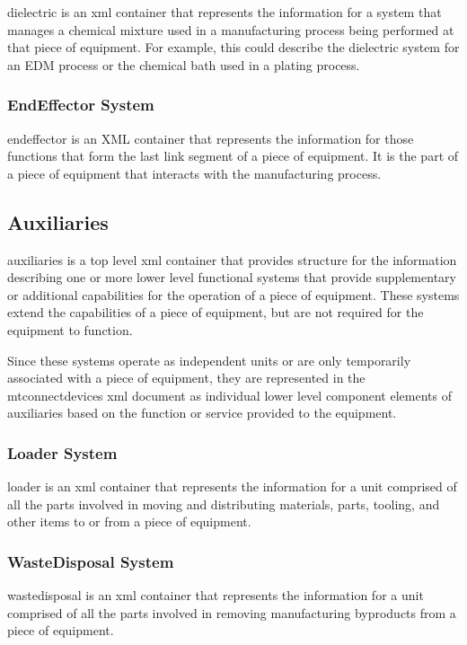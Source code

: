 \gls{dielectric} is an \gls{xml} container that represents the information for a system that manages a chemical mixture used in a manufacturing process being performed at that piece of equipment.  For example, this could describe the dielectric system for an EDM process or the chemical bath used in a plating process. 

\subsubsection{EndEffector System}

\gls{endeffector} is an XML container that represents the information for those functions that form the last link segment of a piece of equipment. It is the part of a piece of equipment that interacts with the manufacturing process.
\subsection{Auxiliaries}

\gls{auxiliaries} is a \gls{top level} \gls{xml} container that provides structure for the information describing one or more \gls{lower level} functional systems that provide supplementary or additional capabilities for the operation of a piece of equipment.  These systems extend the capabilities of a piece of equipment, but are not required for the equipment to function.

Since these systems operate as independent units or are only temporarily associated with a piece of equipment, they are represented in the \gls{mtconnectdevices} \gls{xml} document as individual \gls{lower level} \gls{component} elements of \gls{auxiliaries} based on the function or service provided to the equipment.

\subsubsection{Loader System}

\gls{loader} is an \gls{xml} container that represents the information for a unit comprised of all the parts involved in moving and distributing materials, parts, tooling, and other items to or from a piece of equipment.

\subsubsection{WasteDisposal System}

\gls{wastedisposal} is an \gls{xml} container that represents the information for a unit comprised of all the parts involved in removing manufacturing byproducts from a piece of equipment.

